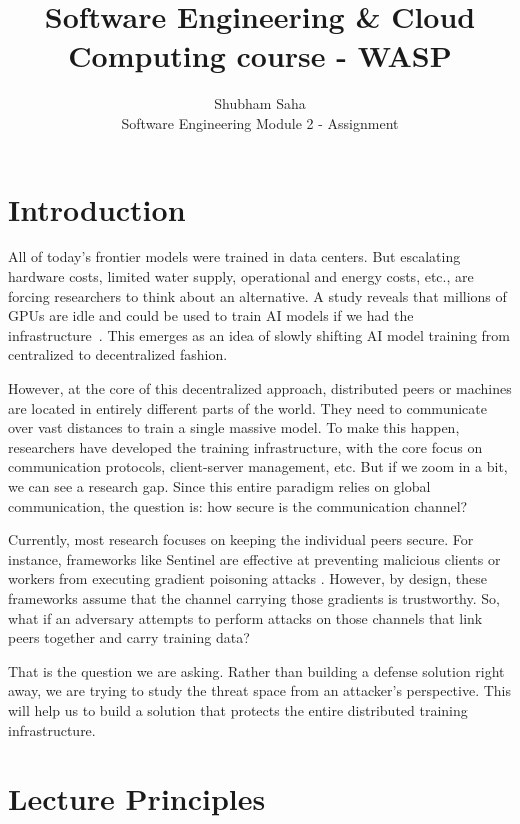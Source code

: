\documentclass[11pt,a4paper]{article}
\title{\vspace{-2.0cm}Software Engineering \& Cloud Computing course - WASP}
\author{Shubham Saha\\
\small Software Engineering Module 2 - Assignment}
\begin{document}
\maketitle\vspace{-0.8cm}

\section{Introduction}

All of today's frontier models were trained in data centers. But escalating hardware costs, limited water supply, operational and energy costs, etc., are forcing researchers to think about an alternative. A study reveals that millions of GPUs are idle and could be used to train AI models if we had the infrastructure~\cite{yuan2022decentralized}. This emerges as an idea of slowly shifting AI model training from centralized to decentralized fashion.

However, at the core of this decentralized approach, distributed peers or machines are located in entirely different parts of the world. They need to communicate over vast distances to train a single massive model. To make this happen, researchers have developed the training infrastructure, with the core focus on communication protocols, client-server management, etc. But if we zoom in a bit, we can see a research gap. Since this entire paradigm relies on global communication, the question is: how secure is the communication channel?

Currently, most research focuses on keeping the individual peers secure. For instance, frameworks like Sentinel are effective at preventing malicious clients or workers from executing gradient poisoning attacks \cite{dolatabadi2026sentinel}. However, by design, these frameworks assume that the channel carrying those gradients is trustworthy. So, what if an adversary attempts to perform attacks on those channels that link peers together and carry training data?

That is the question we are asking. Rather than building a defense solution right away, we are trying to study the threat space from an attacker's perspective. This will help us to build a solution that protects the entire distributed training infrastructure.

\section{Lecture Principles}
\end{document}

